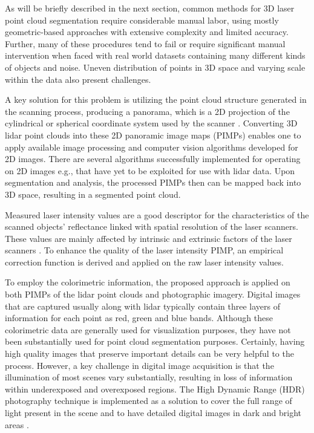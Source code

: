 \documentclass[final,3p,times,twocolumn,authoryear]{elsarticle}
\begin{document}
As will be briefly described in the next section, common methods for 3D laser point cloud segmentation require considerable manual labor, using mostly geometric-based approaches with extensive complexity and limited accuracy. Further, many of these procedures tend to fail or require significant manual intervention when faced with real world datasets containing many different kinds of objects and noise.  Uneven distribution of points in 3D space and varying scale within the data also present challenges. 

A key solution for this problem is utilizing the point cloud structure generated in the scanning process, producing a panorama, which is a 2D projection of the cylindrical or spherical coordinate system used by the scanner \cite{olsen2010}. Converting 3D lidar point clouds into these 2D panoramic image maps (PIMPs) enables one to apply available image processing and computer vision algorithms developed for 2D images. There are several algorithms successfully implemented for operating on 2D images e.g., \cite{szeliski2010} that have yet to be exploited for use with lidar data.  Upon segmentation and analysis, the processed PIMPs then can be mapped back into 3D space, resulting in a segmented point cloud. 

Measured laser intensity values are a good descriptor for the characteristics of the scanned objects' reflectance linked with spatial resolution of the laser scanners. These values are mainly affected by intrinsic and extrinsic factors of the laser scanners \cite{kashani2015}.  To enhance the quality of the laser intensity PIMP, an empirical correction function is derived and applied on the raw laser intensity values. 

To employ the colorimetric information, the proposed approach is applied on both PIMPs of the lidar point clouds and photographic imagery. Digital images that are captured usually along with lidar typically contain three layers of information for each point as red, green and blue bands. Although these colorimetric data are generally used for visualization purposes, they have not been substantially used for point cloud segmentation purposes. Certainly, having high quality images that preserve important details can be very helpful to the process. However, a key challenge in digital image acquisition is that the illumination of most scenes vary substantially, resulting in loss of information within underexposed and overexposed regions. The High Dynamic Range (HDR) photography technique is implemented as a solution to cover the full range of light present in the scene and to have detailed digital images in dark and bright areas \cite{reinhard2010,TMO}. 
\end{document}
